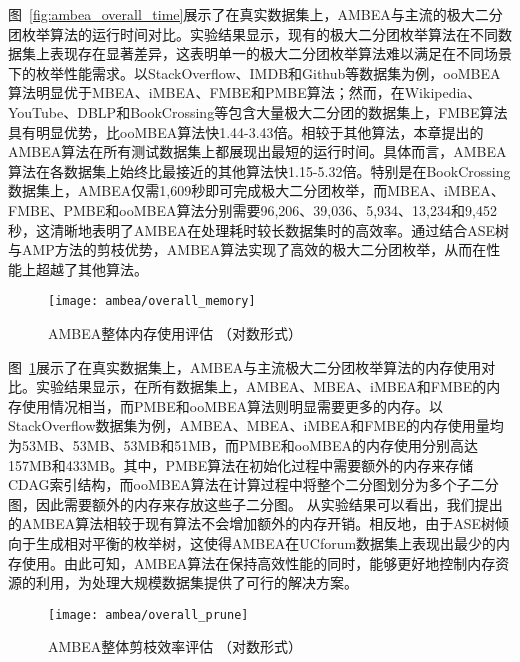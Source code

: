图~\ref{fig:ambea_overall_time}展示了在真实数据集上，AMBEA与主流的极大二分团枚举算法的运行时间对比。实验结果显示，现有的极大二分团枚举算法在不同数据集上表现存在显著差异，这表明单一的极大二分团枚举算法难以满足在不同场景下的枚举性能需求。以StackOverflow、IMDB和Github等数据集为例，ooMBEA算法明显优于MBEA、iMBEA、FMBE和PMBE算法；然而，在Wikipedia、YouTube、DBLP和BookCrossing等包含大量极大二分团的数据集上，FMBE算法具有明显优势，比ooMBEA算法快1.44-3.43倍。相较于其他算法，本章提出的AMBEA算法在所有测试数据集上都展现出最短的运行时间。具体而言，AMBEA算法在各数据集上始终比最接近的其他算法快1.15-5.32倍。特别是在BookCrossing数据集上，AMBEA仅需1,609秒即可完成极大二分团枚举，而MBEA、iMBEA、FMBE、PMBE和ooMBEA算法分别需要96,206、39,036、5,934、13,234和9,452秒，这清晰地表明了AMBEA在处理耗时较长数据集时的高效率。通过结合ASE树与AMP方法的剪枝优势，AMBEA算法实现了高效的极大二分团枚举，从而在性能上超越了其他算法。


\begin{figure} [H]
  \centering
  \vspace{0.1in}
  \texttt{[image: ambea/overall\_memory]}
  \caption{AMBEA整体内存使用评估 （对数形式）}
  \label{fig:ambea_overall_memory}
\end{figure}


图~\ref{fig:ambea_overall_memory}展示了在真实数据集上，AMBEA与主流极大二分团枚举算法的内存使用对比。实验结果显示，在所有数据集上，AMBEA、MBEA、iMBEA和FMBE的内存使用情况相当，而PMBE和ooMBEA算法则明显需要更多的内存。以StackOverflow数据集为例，AMBEA、MBEA、iMBEA和FMBE的内存使用量均为53MB、53MB、53MB和51MB，而PMBE和ooMBEA的内存使用分别高达157MB和433MB。其中，PMBE算法在初始化过程中需要额外的内存来存储CDAG索引结构，而ooMBEA算法在计算过程中将整个二分图划分为多个子二分图，因此需要额外的内存来存放这些子二分图。
从实验结果可以看出，我们提出的AMBEA算法相较于现有算法不会增加额外的内存开销。相反地，由于ASE树倾向于生成相对平衡的枚举树，这使得AMBEA在UCforum数据集上表现出最少的内存使用。由此可知，AMBEA算法在保持高效性能的同时，能够更好地控制内存资源的利用，为处理大规模数据集提供了可行的解决方案。


\begin{figure} [H]
  \centering
  \vspace{0.1in}
  \texttt{[image: ambea/overall\_prune]}
  \caption{AMBEA整体剪枝效率评估 （对数形式）}
  \label{fig:ambea_overall_prune}
\end{figure}



